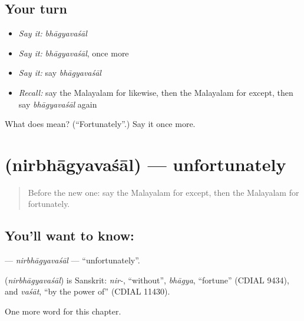 \subsection*{Your turn}
\begin{itemize}
\raggedright
  \item \emph{Say it:} \emph{bhāgyavaśāl}
  \item \emph{Say it:} \emph{bhāgyavaśāl}, once more
  \item \emph{Say it:} say \emph{bhāgyavaśāl}
  \item \emph{Recall:} say the Malayalam for likewise, then the Malayalam for except, then say \emph{bhāgyavaśāl} again
\end{itemize}

\begin{tcolorbox}[breakable,colback=teal!4,colframe=teal!35!black,title={Before you move on}]
What does  mean? (\textquotedblleft{}Fortunately\textquotedblright{}.) Say it once more.
\end{tcolorbox}
\section[\texorpdfstring{\ml{നിർഭാഗ്യവശാൽ} (nirbhāgyavaśāl)}{നിർഭാഗ്യവശാൽ (nirbhāgyavaśāl)}]{ (nirbhāgyavaśāl) — unfortunately}

\label{lesson:ML-C201-nirbhagyavasal}



\begin{quote}
Before the new one: say the Malayalam for except, then the Malayalam for fortunately.
\end{quote}

\subsection*{You'll want to know: }
\textbf{} — \emph{nirbhāgyavaśāl} — \textquotedblleft{}unfortunately\textquotedblright{}.

\begin{cousinweb}
\textbf{} (\emph{nirbhāgyavaśāl}) is Sanskrit: \emph{nir-}, \textquotedblleft{}without\textquotedblright{}, \emph{bhāgya}, \textquotedblleft{}fortune\textquotedblright{} (CDIAL 9434), and \emph{vaśāt}, \textquotedblleft{}by the power of\textquotedblright{} (CDIAL 11430).
\end{cousinweb}

\begin{grammarlens}[title={What you've built}]
One more word for this chapter.
\end{grammarlens}

